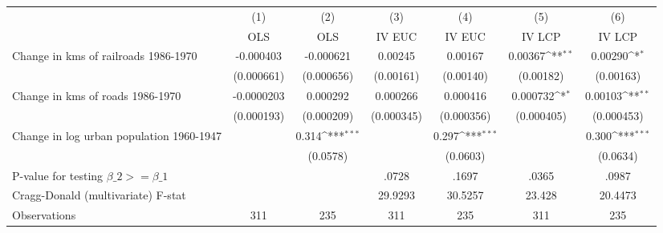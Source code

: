 {
\def\sym#1{\ifmmode^{#1}\else\(^{#1}\)\fi}
\begin{tabular}{l*{6}{c}}
\hline\hline
                &\multicolumn{1}{c}{(1)}&\multicolumn{1}{c}{(2)}&\multicolumn{1}{c}{(3)}&\multicolumn{1}{c}{(4)}&\multicolumn{1}{c}{(5)}&\multicolumn{1}{c}{(6)}\\
                &\multicolumn{1}{c}{OLS}&\multicolumn{1}{c}{OLS}&\multicolumn{1}{c}{IV EUC}&\multicolumn{1}{c}{IV EUC}&\multicolumn{1}{c}{IV LCP}&\multicolumn{1}{c}{IV LCP}\\
\hline
Change in kms of railroads 1986-1970&-0.000403         &-0.000621         &  0.00245         &  0.00167         &  0.00367\sym{**} &  0.00290\sym{*}  \\
                &(0.000661)         &(0.000656)         &(0.00161)         &(0.00140)         &(0.00182)         &(0.00163)         \\
[1em]
Change in kms of roads 1986-1970&-0.0000203         & 0.000292         & 0.000266         & 0.000416         & 0.000732\sym{*}  &  0.00103\sym{**} \\
                &(0.000193)         &(0.000209)         &(0.000345)         &(0.000356)         &(0.000405)         &(0.000453)         \\
[1em]
Change in log urban population 1960-1947&                  &    0.314\sym{***}&                  &    0.297\sym{***}&                  &    0.300\sym{***}\\
                &                  & (0.0578)         &                  & (0.0603)         &                  & (0.0634)         \\
\hline
P-value for testing $\beta\_{2} >= \beta\_{1}$&                  &                  &    .0728         &    .1697         &    .0365         &    .0987         \\
Cragg-Donald (multivariate) F-stat&                  &                  &  29.9293         &  30.5257         &   23.428         &  20.4473         \\
Observations    &      311         &      235         &      311         &      235         &      311         &      235         \\
\hline\hline
\end{tabular}
}

